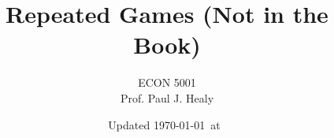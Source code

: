 

\title[Repeated Games]{Repeated Games (Not in the Book)}
\author[ECON 5001]{ECON 5001\\Prof. Paul J. Healy} \color{metrop}
\institute[OSU]{}
\date[]{\vfill {\tiny Updated \today\ at\ \DTMcurrenttime}}

%
